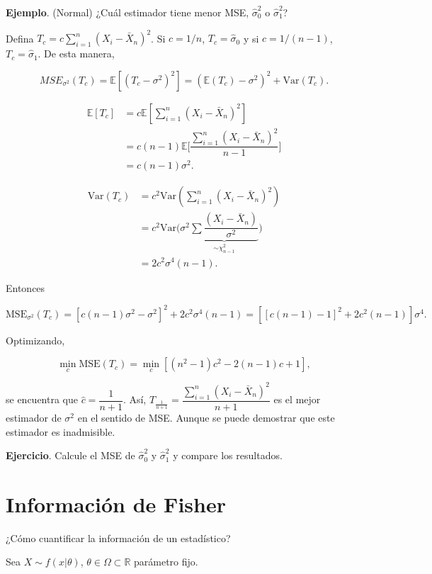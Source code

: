 \documentclass[
  12pt,
]{book}
\begin{document}
\textbf{Ejemplo}. (Normal) ¿Cuál estimador tiene menor MSE, \(\hat\sigma^2_0\) o \(\hat\sigma^2_1\)?

Defina \(T_c = c\sum_{i=1}^{n}\left(X_{i}-\bar{X}_{n}\right)^{2}\). Si \(c = 1/n\), \(T_c = \hat\sigma_0\) y si \(c = 1/(n-1)\), \(T_c = \hat\sigma_1\). De esta manera,

\[MSE_{\sigma^2}(T_c) = \mathbb E[(T_c-\sigma^2)^2] =(\mathbb E(T_c)-\sigma^2)^2+\text{Var}(T_c).\]

\begin{align*}
  \mathbb E[T_c]
  &= c\mathbb E[\sum_{i=1}^{n}\left(X_{i}-\bar{X}_{n}\right)^{2}] \\
  &= c(n-1)\mathbb E\bigg[\dfrac{\sum_{i=1}^{n}\left(X_{i}-\bar{X}_{n}\right)^{2}}{n-1}\bigg] \\
  &= c(n-1)\sigma^2.
\end{align*}

\begin{align*}
  \text{Var}(T_c)
  &= c^2\text{Var}(\sum_{i=1}^{n}\left(X_{i}-\bar{X}_{n}\right)^{2}) \\
  &= c^2\text{Var}\Bigg(\sigma^2\underbrace{\sum\dfrac{(X_i-\bar X_n)}{\sigma^2}}_{\sim\chi^2_{n-1}}\Bigg) \\
  &= 2c^2\sigma^4(n-1).
\end{align*}

Entonces

\[\mathrm{MSE}_{\sigma^2}(T_c) = [c(n-1)\sigma^2-\sigma^2]^2+2c^2\sigma^4(n-1) =
[[c(n-1)-1]^2+2c^2(n-1)]\sigma^4.\]

Optimizando,

\[\min_c \mathrm{MSE}(T_c) = \min_c[(n^2-1)c^2-2(n-1)c+1],\]

se encuentra que \(\hat c = \dfrac 1{n+1}\). Así,
\(T_{\frac{1}{n+1}} = \dfrac{\sum_{i=1}^{n}\left(X_{i}-\bar{X}_{n}\right)^{2}}{n+1}\)
es el mejor estimador de \(\sigma^2\) en el sentido de MSE. Aunque se puede
demostrar que este estimador es inadmisible.

\textbf{Ejercicio}. Calcule el MSE de \(\hat\sigma_0^2\) y \(\hat\sigma_1^2\) y compare
los resultados.

\hypertarget{informaciuxf3n-de-fisher}{%
\section{Información de Fisher}\label{informaciuxf3n-de-fisher}}

¿Cómo cuantificar la información de un estadístico?

Sea \(X\sim f(x|\theta)\), \(\theta \in \Omega \subset \mathbb R\) parámetro fijo.
\end{document}
